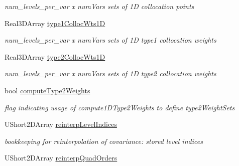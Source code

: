 \begin{DoxyCompactItemize}
\begin{DoxyCompactList}\small\item\em num\+\_\+levels\+\_\+per\+\_\+var x num\+Vars sets of 1D collocation points \end{DoxyCompactList}\item 
Real3\+D\+Array \hyperlink{classPecos_1_1IntegrationDriver_a5af9b398ecf07f41783595ec45b6eafe}{type1\+Colloc\+Wts1D}\label{classPecos_1_1IntegrationDriver_a5af9b398ecf07f41783595ec45b6eafe}

\begin{DoxyCompactList}\small\item\em num\+\_\+levels\+\_\+per\+\_\+var x num\+Vars sets of 1D type1 collocation weights \end{DoxyCompactList}\item 
Real3\+D\+Array \hyperlink{classPecos_1_1IntegrationDriver_aa9a7062cd531acf0f989d6f500724eff}{type2\+Colloc\+Wts1D}\label{classPecos_1_1IntegrationDriver_aa9a7062cd531acf0f989d6f500724eff}

\begin{DoxyCompactList}\small\item\em num\+\_\+levels\+\_\+per\+\_\+var x num\+Vars sets of 1D type2 collocation weights \end{DoxyCompactList}\item 
bool \hyperlink{classPecos_1_1IntegrationDriver_a637037ea4cf412ec8aa2c932c39e8043}{compute\+Type2\+Weights}\label{classPecos_1_1IntegrationDriver_a637037ea4cf412ec8aa2c932c39e8043}

\begin{DoxyCompactList}\small\item\em flag indicating usage of compute1\+D\+Type2\+Weights to define type2\+Weight\+Sets \end{DoxyCompactList}\item 
U\+Short2\+D\+Array \hyperlink{classPecos_1_1IntegrationDriver_a57eaeff5743cf77e1518a2125fa00a72}{reinterp\+Level\+Indices}\label{classPecos_1_1IntegrationDriver_a57eaeff5743cf77e1518a2125fa00a72}

\begin{DoxyCompactList}\small\item\em bookkeeping for reinterpolation of covariance\+: stored level indices \end{DoxyCompactList}\item 
U\+Short2\+D\+Array \hyperlink{classPecos_1_1IntegrationDriver_a991cf5ee032abea7de271eaeb1171e83}{reinterp\+Quad\+Orders}\label{classPecos_1_1IntegrationDriver_a991cf5ee032abea7de271eaeb1171e83}


\end{DoxyCompactItemize}
